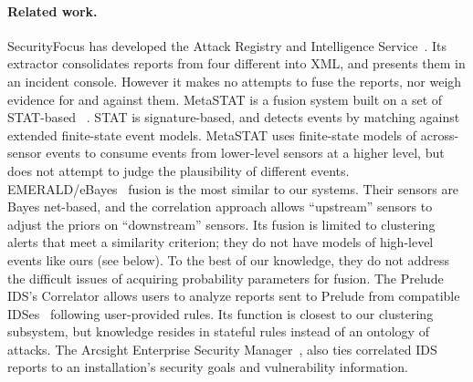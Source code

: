 \paragraph{Related work.}
SecurityFocus has developed the
Attack Registry and Intelligence Service~.
Its extractor consolidates {\ids} reports from four different
{\idses} into XML, and presents them in an incident
console.  However it makes no attempts to fuse the reports, nor weigh
evidence for and against them.
MetaSTAT is a fusion system built on a set of STAT-based
{\idses}~\cite{vigna01:designing}.  
STAT is signature-based, and detects events by matching
against extended finite-state event models.  MetaSTAT uses
finite-state models of across-sensor events to consume events
from lower-level sensors at a higher level,
but does not attempt to judge the plausibility of different
events.
EMERALD/eBayes~\cite{raid2001-pac} fusion is the most similar to our systems.
Their sensors are Bayes net-based, and the correlation approach
allows ``upstream'' sensors to adjust the priors on ``downstream''
sensors.
Its fusion is limited to clustering alerts that meet a
similarity criterion; they do not have models of high-level events like
ours (see below).  To the best of our knowledge, they do not
address the difficult issues of acquiring probability parameters for \ids fusion.
The Prelude IDS's Correlator allows users to analyze reports sent to Prelude 
from compatible IDSes~\cite{PreludeCor} following user-provided rules.  Its function is closest to
our clustering subsystem, but knowledge resides in stateful 
rules instead of an ontology of attacks. 
The Arcsight Enterprise Security Manager~\cite{ArcsightEsm},
also ties correlated IDS reports to an installation's security goals
and vulnerability information.


